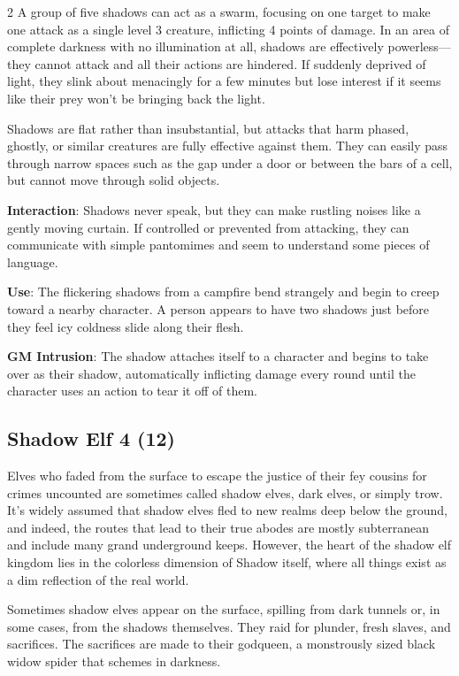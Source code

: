 \begin{multicols}{2}
A group of five shadows can act as a swarm, focusing on one target to make one attack as a single level 3 creature, inflicting 4 points of damage. In an area of complete darkness with no illumination at all, shadows are effectively powerless—they cannot attack and all their actions are hindered. If suddenly deprived of light, they slink about menacingly for a few minutes but lose interest if it seems like their prey won’t be bringing back the light. 

Shadows are flat rather than insubstantial, but attacks that harm phased, ghostly, or similar creatures are fully effective against them. They can easily pass through narrow spaces such as the gap under a door or between the bars of a cell, but cannot move through solid objects. 

\textbf{Interaction}: Shadows never speak, but they can make rustling noises like a gently moving curtain. If controlled or prevented from attacking, they can communicate with simple pantomimes and seem to understand some pieces of language. 

\textbf{Use}: The flickering shadows from a campfire bend strangely and begin to creep toward a nearby character. A person appears to have two shadows just before they feel icy coldness slide along their flesh.

\textbf{GM Intrusion}: The shadow attaches itself to a character and begins to take over as their shadow, automatically inflicting damage every round until the character uses an action to tear it off of them.

\subsection{Shadow Elf	4 (12)}

Elves who faded from the surface to escape the justice of their fey cousins for crimes uncounted are sometimes called shadow elves, dark elves, or simply trow. It’s widely assumed that shadow elves fled to new realms deep below the ground, and indeed, the routes that lead to their true abodes are mostly subterranean and include many grand underground keeps. However, the heart of the shadow elf kingdom lies in the colorless dimension of Shadow itself, where all things exist as a dim reflection of the real world.

Sometimes shadow elves appear on the surface, spilling from dark tunnels or, in some cases, from the shadows themselves. They raid for plunder, fresh slaves, and sacrifices. The sacrifices are made to their godqueen, a monstrously sized black widow spider that schemes in darkness.


\end{multicols}
